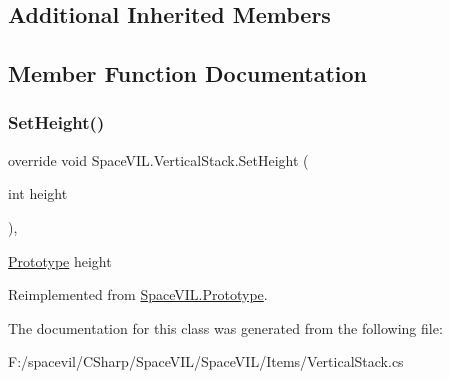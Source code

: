 \subsection*{Additional Inherited Members}


\subsection{Member Function Documentation}
\mbox{\label{class_space_v_i_l_1_1_vertical_stack_a1e2360b005a6fb8e503dc60d27f1f021}} 
\subsubsection{\texorpdfstring{Set\+Height()}{SetHeight()}}
{\footnotesize\ttfamily override void Space\+V\+I\+L.\+Vertical\+Stack.\+Set\+Height (\begin{DoxyParamCaption}\item[{int}]{height }\end{DoxyParamCaption})\hspace{0.3cm}{\ttfamily [inline]}, {\ttfamily [virtual]}}



\mbox{\hyperlink{class_space_v_i_l_1_1_prototype}{Prototype}} height 



Reimplemented from \mbox{\hyperlink{class_space_v_i_l_1_1_prototype_adc0adcbd1c3800d9525798ba7be5832a}{Space\+V\+I\+L.\+Prototype}}.



The documentation for this class was generated from the following file\+:\begin{DoxyCompactItemize}
\item 
F\+:/spacevil/\+C\+Sharp/\+Space\+V\+I\+L/\+Space\+V\+I\+L/\+Items/Vertical\+Stack.\+cs\end{DoxyCompactItemize}
